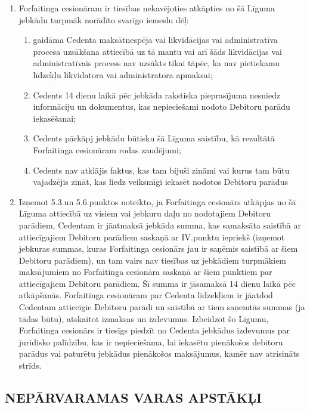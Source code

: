 \documentclass[a4paper]{article}
\begin{document}
\begin{multicols}{2}
\begin{enumerate}
  \item{Forfaitinga cesionāram ir tiesības nekavējoties atkāpties no šā Līguma
jebkādu turpmāk norādīto svarīgo iemeslu dēļ:}

    \begin{enumerate}
    \item{gaidāma Cedenta maksātnespēja vai likvidācijas vai
administratīva procesa uzsākšana attiecībā uz tā mantu vai arī šāds
likvidācijas vai administratīvais process nav uzsākts tikai tāpēc, ka nav
pietiekamu līdzekļu likvidatora vai administratora apmaksai;}

    \item{Cedents 14 dienu laikā pēc jebkāda rakstiska pieprasījuma
nesniedz informāciju un dokumentus, kas nepieciešami nodoto
Debitoru parādu iekasēšanai;}

    \item{Cedents pārkāpj jebkādu būtisku šā Līguma saistību, kā
rezultātā Forfaitinga cesionāram rodas zaudējumi;}

    \item{Cedents nav atklājis faktus, kas tam bijuši zināmi vai kurus tam
būtu vajadzējis zināt, kas liedz veiksmīgi iekasēt nodotos Debitoru
parādus}
    \end{enumerate}

  \item{Izņemot 5.3.un 5.6.punktos noteikto, ja Forfaitinga cesionārs atkāpjas
no šā Līguma attiecībā uz visiem vai jebkuru daļu no nodotajiem
Debitoru parādiem, Cedentam ir jāatmaksā jebkāda summa, kas
samaksāta saistībā ar attiecīgajiem Debitoru parādiem saskaņā ar IV.punktu iepriekš (izņemot jebkuras summas, kuras Forfaitinga cesionārs
jau ir saņēmis saistībā ar šiem Debitoru parādiem), un tam vairs nav
tiesības uz jebkādiem turpmākiem maksājumiem no Forfaitinga
cesionāra saskaņā ar šiem punktiem par attiecīgajiem Debitoru
parādiem. Šī summa ir jāsamaksā 14 dienu laikā pēc atkāpšanās.
Forfaitinga cesionāram par Cedenta līdzekļiem ir jāatdod Cedentam
attiecīgie Debitoru parādi un saistībā ar tiem saņemtās summas (ja
tādas būtu), atskaitot izmaksas un izdevumus.
Izbeidzot šo Līgumu, Forfaitinga cesionārs ir tiesīgs piedzīt no Cedenta
jebkādus izdevumus par juridisko palīdzību, kas ir nepieciešama, lai
iekasētu pienākošos debitoru parādus vai paturētu jebkādus
pienākošos maksājumus, kamēr nav atrisināts strīds.}
  \end{enumerate}

  \subsection{NEPĀRVARAMAS VARAS APSTĀKĻI}


\end{multicols}
\end{document}
